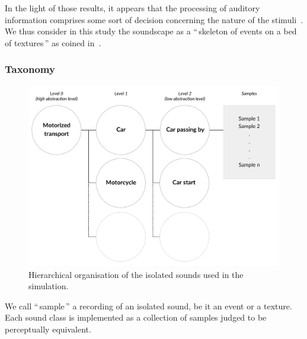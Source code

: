 \documentclass[12pt]{elsarticle}
\newcommand{\ie}{\emph{i.\,e.}}
\newcommand{\cf}{cf.}
\newcommand{\myfloatalign}{\centering}
\begin{document}
In the light of those results, it appears that the processing of auditory information comprises some sort of decision concerning the nature of the stimuli~\cite{nelken2013ear,mcdermott2013summary}. We thus consider in this study the soundscape as a ``\,skeleton of events on a bed of textures\,'' as coined in~\cite{nelken2013ear}.

\subsubsection*{Taxonomy}

\begin{figure}[t]
        \myfloatalign
        \includegraphics[width=.8\linewidth]{gfx/3.pdf}
       \caption{Hierarchical organisation of the isolated sounds used in the simulation.}\label{fig:orgDb}
\end{figure}


We call ``\,sample\,'' a recording of an isolated sound, be it an event or a texture. Each sound class is implemented as a collection of samples judged to be perceptually equivalent.

\end{document}
